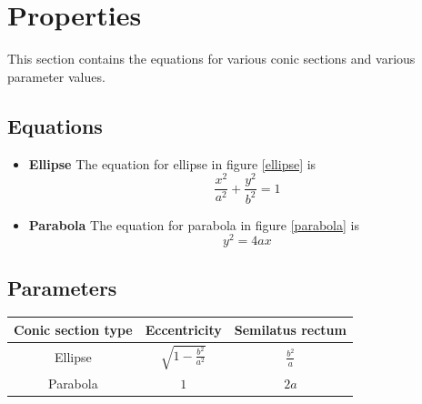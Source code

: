 \documentclass{article}
\begin{document}
\section{Properties}
This section contains the equations for various conic sections and various parameter values.
\subsection{Equations}
\begin{itemize}
    \item \textbf{Ellipse} The equation for ellipse in figure \ref{ellipse} is
    \begin{equation}
        \frac{x^{2}}{a^{2}} + \frac{y^{2}}{b^{2}} = 1
    \end{equation}
    \item \textbf{Parabola} The equation for parabola in figure \ref{parabola} is
    \begin{equation}
        y^{2} = 4ax
    \end{equation}
\end{itemize}
\subsection{Parameters}
\begin{table}[htbp]
    \centering
    \begin{tabular}{|c|c|c|}
        \hline
        Conic section type & Eccentricity & Semilatus rectum \\
        \hline
        Ellipse & $\sqrt{1 - \frac{b^{2}}{a^{2}}}$ & $\frac{b^{2}}{a}$ \\
        Parabola & $1$ & $2a$ \\
        \hline 
    \end{tabular}
\end{table}
\end{document}
